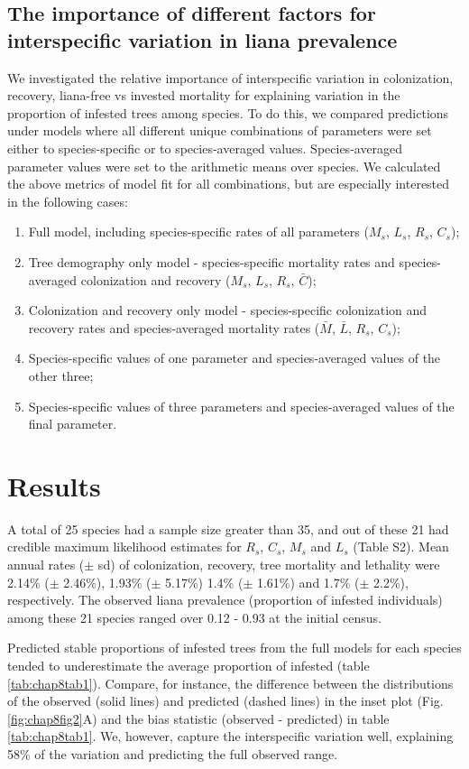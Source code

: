 \documentclass[b5paper,justified]{tufte-book} %
\begin{document}
\begin{fullwidth}
\subsection{The importance of different factors for interspecific variation in liana prevalence}
We investigated the relative importance of interspecific variation in colonization, recovery, liana-free vs invested mortality for explaining variation in the proportion of infested trees among species. To do this, we compared predictions under models where all different unique combinations of parameters were set either to species-specific or to species-averaged values. Species-averaged parameter values were set to the arithmetic means over species. We calculated the above metrics of model fit for all combinations, but are especially interested in the following cases:
\begin{enumerate}
\item	Full model, including species-specific rates of all parameters ($M_s$, $L_s$, $R_s$, $C_s$);
\item	Tree demography only model - species-specific mortality rates and species-averaged colonization and recovery ($M_s$, $L_s$, $R_s$, $\bar{C}$);  
\item	Colonization and recovery only model - species-specific colonization and recovery rates and species-averaged mortality rates ($\bar{M}$, $\bar{L}$, $R_s$, $C_s$);
\item	Species-specific values of one parameter and species-averaged values of the other three;
\item	Species-specific values of three parameters and species-averaged values of the final parameter.
\end{enumerate} 

\section{Results}

A total of 25 species had a sample size greater than 35, and out of these 21 had credible maximum likelihood estimates for $R_s$, $C_s$, $M_s$ and $L_s$ (Table S2). Mean annual rates ($\pm$ sd) of colonization, recovery, tree mortality and lethality were 2.14\% ($\pm$ 2.46\%), 1.93\% ($\pm$ 5.17\%) 1.4\% ($\pm$ 1.61\%) and 1.7\% ($\pm$ 2.2\%), respectively. The observed liana prevalence (proportion of infested individuals) among these 21 species ranged over 0.12 - 0.93 at the initial census.

Predicted stable proportions of infested trees from the full models for each species tended to underestimate the average proportion of infested (table \ref{tab:chap8tab1}). Compare, for instance, the difference between the distributions of the observed (solid lines) and predicted (dashed lines) in the inset plot (Fig. \ref{fig:chap8fig2}A) and the bias statistic (observed - predicted) in table \ref{tab:chap8tab1}. We, however, capture the interspecific variation well, explaining 58\% of the variation and predicting the full observed range. 




\end{fullwidth}
\end{document}
